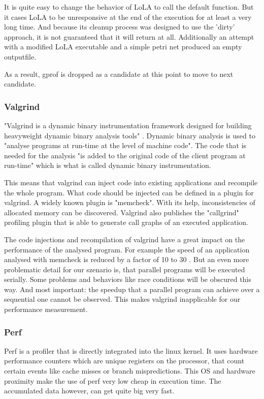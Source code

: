 It is quite easy to change the behavior of LoLA to call the default  function. But it cases LoLA to be unresponsive at the end of the execution for at least a very long time. And because its cleanup process was designed to use the 'dirty' approach, it is not guaranteed that it will return at all. Additionally an attempt with a modified LoLA executable and a simple petri net produced an empty outputfile.

As a result, gprof is dropped as a candidate at this point to move to next candidate.

\subsubsection{Valgrind}
"Valgrind is a dynamic binary instrumentation framework designed for building heavyweight dynamic binary analysis tools" \cite{nethercote2007valgrind}. Dynamic binary analysis is used to "analyse programs at run-time at the level of machine code". The code that is needed for the analysis "is added to the original code of the client program at run-time" which is what is called dynamic binary instrumentation.

This means that valgrind can inject code into existing applications and recompile the whole program. What code should be injected can be defined in a plugin for valgrind. A widely known plugin is "memcheck". With its help, inconsistencies of allocated memory can be discovered. Valgrind also publishes the "callgrind" profiling plugin that is able to generate call graphs of an executed application.

The code injections and recompilation of valgrind have a great impact on the performance of the analysed program. For example the speed of an application analysed with memcheck is reduced by a factor of 10 to 30 \cite{valgrindTools}. But an even more problematic detail for our szenario is, that parallel programs will be executed serially. Some problems and behaviors like race conditions will be obscured this way. And most important: the speedup that a parallel program can achieve over a sequential one cannot be observed. This makes valgrind inapplicable for our performance measurement.

\subsubsection{Perf}
Perf is a profiler that is directly integrated into the linux kernel. It uses hardware performance counters which are unique registers on the processor, that count certain events like cache misses or branch mispredictions. This OS and hardware proximity make the use of perf very low cheap in execution time. The accumulated data however, can get quite big very fast.

